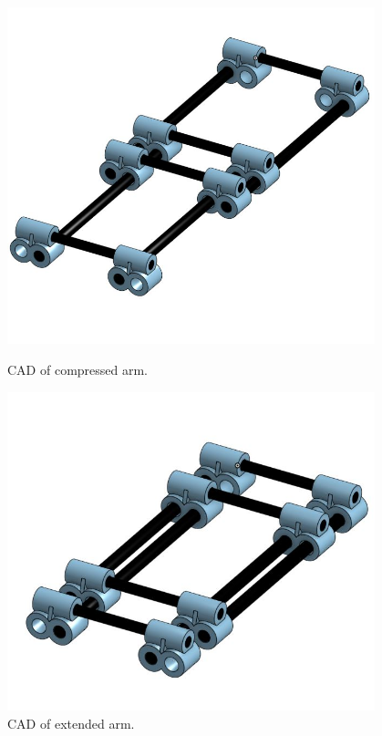 \begin{figure}[ht]
\centering
\begin{minipage}[b]{.48\textwidth}
  \centering
  \includegraphics[width=0.95\textwidth]{Meetings/October/10-29-21/10-29-21_CAD_Figure3 - Nathan Forrer.JPG}
  \caption{CAD of compressed arm.}
  \label{fig:pic5}
\end{minipage}%
\hfill%
\begin{minipage}[b]{.48\textwidth}
  \centering
  \includegraphics[width=0.95\textwidth]{Meetings/October/10-29-21/10-29-21_CAD_Figure4 - Nathan Forrer.JPG}
  \caption{CAD of extended arm.}
  \label{fig:pic6}
\end{minipage}
\end{figure}

